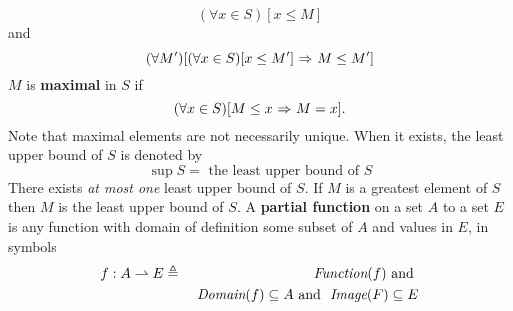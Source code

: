 \documentclass{myproc}
\begin{document}
		\[ (\forall{x} \in S)[x \le M]\] and
		\[(\forall{M'})[(\forall{x \in S})[x \le M']\ \mbox{$\Rightarrow$}\ M \le M']\]
	\w $M$ is {\bf{}maximal} in $S$ if 
		\[ (\forall{x \in S})[M \le x\ \mbox{$\Rightarrow$}\ M = x]. \]
		Note that maximal elements are not necessarily unique.
	\een
\w When it exists, the least upper bound of $S$ is denoted by
	\[ \sup S = \mbox{\ the least upper bound of $S$} \]
	\bit
	\w There exists {\em{}at most one\/} least upper bound of $S$.
	\w If $M$ is a greatest element 
		of $S$ then $M$ is the least upper bound of $S$.
	\eit
\w A {\bf{}partial function} on a set $A$ to a set $E$ is any function
	with domain of definition some subset of $A$ and values
	in $E$, in symbols
	\begin{eqnarray*}
	f: A \rightharpoonup E &\triangleq &
		\mbox{\ \em{}Function}(f) \mbox{\ and\ } \\
		&&\mbox{\ \em{}Domain}(f) \subseteq A
		\mbox{\ and\ } \mbox{\ \em{}Image}(F) \subseteq E
	\end{eqnarray*}
\end{document}
